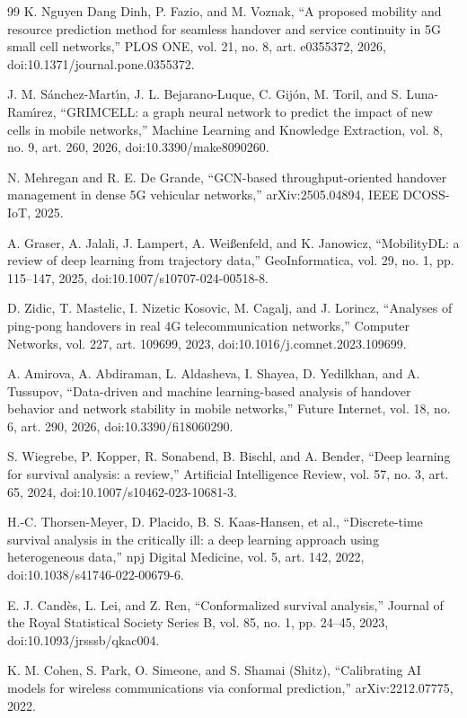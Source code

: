 \begin{thebibliography}{99}
 K. Nguyen Dang Dinh, P. Fazio, and M. Voznak, ``A proposed mobility and resource prediction method for seamless handover and service continuity in 5G small cell networks,'' PLOS ONE, vol. 21, no. 8, art. e0355372, 2026, doi:10.1371/journal.pone.0355372.

 J. M. S\'anchez-Mart\'{\i}n, J. L. Bejarano-Luque, C. Gij\'on, M. Toril, and S. Luna-Ram\'{\i}rez, ``GRIMCELL: a graph neural network to predict the impact of new cells in mobile networks,'' Machine Learning and Knowledge Extraction, vol. 8, no. 9, art. 260, 2026, doi:10.3390/make8090260.

 N. Mehregan and R. E. De Grande, ``GCN-based throughput-oriented handover management in dense 5G vehicular networks,'' arXiv:2505.04894, IEEE DCOSS-IoT, 2025.

 A. Graser, A. Jalali, J. Lampert, A. Wei\ss{}enfeld, and K. Janowicz, ``MobilityDL: a review of deep learning from trajectory data,'' GeoInformatica, vol. 29, no. 1, pp. 115--147, 2025, doi:10.1007/s10707-024-00518-8.

 D. Zidic, T. Mastelic, I. Nizetic Kosovic, M. Cagalj, and J. Lorincz, ``Analyses of ping-pong handovers in real 4G telecommunication networks,'' Computer Networks, vol. 227, art. 109699, 2023, doi:10.1016/j.comnet.2023.109699.

 A. Amirova, A. Abdiraman, L. Aldasheva, I. Shayea, D. Yedilkhan, and A. Tussupov, ``Data-driven and machine learning-based analysis of handover behavior and network stability in mobile networks,'' Future Internet, vol. 18, no. 6, art. 290, 2026, doi:10.3390/fi18060290.

 S. Wiegrebe, P. Kopper, R. Sonabend, B. Bischl, and A. Bender, ``Deep learning for survival analysis: a review,'' Artificial Intelligence Review, vol. 57, no. 3, art. 65, 2024, doi:10.1007/s10462-023-10681-3.

 H.-C. Thorsen-Meyer, D. Placido, B. S. Kaas-Hansen, et al., ``Discrete-time survival analysis in the critically ill: a deep learning approach using heterogeneous data,'' npj Digital Medicine, vol. 5, art. 142, 2022, doi:10.1038/s41746-022-00679-6.

 E. J. Cand\`es, L. Lei, and Z. Ren, ``Conformalized survival analysis,'' Journal of the Royal Statistical Society Series B, vol. 85, no. 1, pp. 24--45, 2023, doi:10.1093/jrsssb/qkac004.

 K. M. Cohen, S. Park, O. Simeone, and S. Shamai (Shitz), ``Calibrating AI models for wireless communications via conformal prediction,'' arXiv:2212.07775, 2022.


\end{thebibliography}
